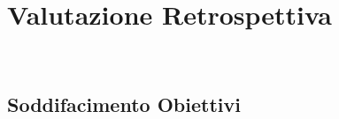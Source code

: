 
\chapter{Valutazione Retrospettiva}
\label{cap:analisi-requisiti}

\\

\section{Soddifacimento Obiettivi}

